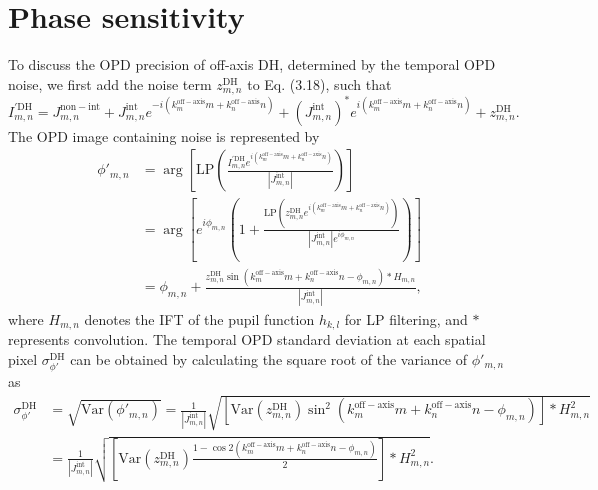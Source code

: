 \section{Phase sensitivity}

To discuss the OPD precision of off-axis DH, determined by the temporal OPD noise, we first add the noise term $z_{m,n}^{\mathrm{DH}}$ to Eq. (3.18), such that
\begin{equation}
I_{m,n}^{'\mathrm{DH}} = J_{m,n}^{\mathrm{non-int}} + J_{m,n}^{\mathrm{int}} e^{-i(k_m^{\mathrm{off-axis}}m + k_n^{\mathrm{off-axis}}n)} + (J_{m,n}^{\mathrm{int}})^* e^{i(k_m^{\mathrm{off-axis}}m + k_n^{\mathrm{off-axis}}n)} + z_{m,n}^{\mathrm{DH}}.
\end{equation}
The OPD image containing noise is represented by
\begin{align}
\phi'_{m,n} &= \arg\left[\mathrm{LP}\left(\frac{I_{m,n}^{'\mathrm{DH}} e^{i(k_m^{\mathrm{off-axis}}m + k_n^{\mathrm{off-axis}}n)}}{|J_{m,n}^{\mathrm{int}}|}\right)\right] \nonumber \\
&= \arg\left[e^{i\phi_{m,n}}\left(1 + \frac{\mathrm{LP}(z_{m,n}^{\mathrm{DH}} e^{i(k_m^{\mathrm{off-axis}}m + k_n^{\mathrm{off-axis}}n)})}{|J_{m,n}^{\mathrm{int}}| e^{i\phi_{m,n}}}\right)\right] \nonumber \\
&= \phi_{m,n} + \frac{z_{m,n}^{\mathrm{DH}} \sin(k_m^{\mathrm{off-axis}}m + k_n^{\mathrm{off-axis}}n - \phi_{m,n}) \ast H_{m,n}}{|J_{m,n}^{\mathrm{int}}|},
\end{align}
where $H_{m,n}$ denotes the IFT of the pupil function $h_{k,l}$ for LP filtering, and $\ast$ represents convolution. The temporal OPD standard deviation at each spatial pixel $\sigma_{\phi'}^{\mathrm{DH}}$ can be obtained by calculating the square root of the variance of $\phi'_{m,n}$ as
\begin{align}
\sigma_{\phi'}^{\mathrm{DH}} &= \sqrt{\mathrm{Var}(\phi'_{m,n})} = \frac{1}{|J_{m,n}^{\mathrm{int}}|} \sqrt{[\mathrm{Var}(z_{m,n}^{\mathrm{DH}}) \sin^2(k_m^{\mathrm{off-axis}}m + k_n^{\mathrm{off-axis}}n - \phi_{m,n})] \ast H_{m,n}^2} \nonumber \\
&= \frac{1}{|J_{m,n}^{\mathrm{int}}|} \sqrt{\left[\mathrm{Var}(z_{m,n}^{\mathrm{DH}}) \frac{1 - \cos 2(k_m^{\mathrm{off-axis}}m + k_n^{\mathrm{off-axis}}n - \phi_{m,n})}{2}\right] \ast H_{m,n}^2}.
\end{align}

